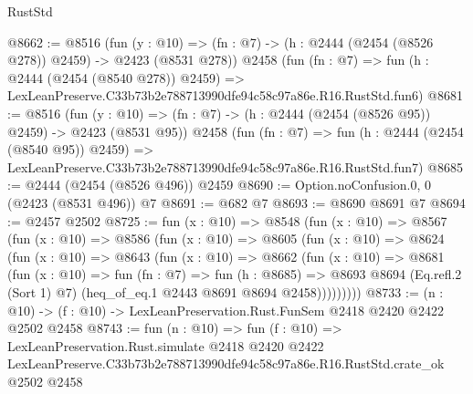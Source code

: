 \begin{lexlean}{RustStd}
\begin{coremodule}
@8662 := @8516
    (fun (y : @10) => (fn : @7) -> (h : @2444 (@2454 (@8526 @278)) @2459) -> @2423 (@8531 @278))
    @2458
    (fun (fn : @7) =>
    fun (h : @2444 (@2454 (@8540 @278)) @2459) =>
    LexLeanPreserve.C33b73b2e788713990dfe94c58c97a86e.R16.RustStd.fun6)
@8681 := @8516
    (fun (y : @10) => (fn : @7) -> (h : @2444 (@2454 (@8526 @95)) @2459) -> @2423 (@8531 @95))
    @2458
    (fun (fn : @7) =>
    fun (h : @2444 (@2454 (@8540 @95)) @2459) =>
    LexLeanPreserve.C33b73b2e788713990dfe94c58c97a86e.R16.RustStd.fun7)
@8685 := @2444 (@2454 (@8526 @496)) @2459
@8690 := Option.noConfusion.{0, 0} (@2423 (@8531 @496)) @7
@8691 := @682 @7
@8693 := @8690 @8691 @7
@8694 := @2457 @2502
@8725 := fun (x : @10) =>
  @8548
    (fun (x : @10) =>
    @8567
      (fun (x : @10) =>
      @8586
        (fun (x : @10) =>
        @8605
          (fun (x : @10) =>
          @8624
            (fun (x : @10) =>
            @8643
              (fun (x : @10) =>
              @8662
                (fun (x : @10) =>
                @8681
                  (fun (x : @10) =>
                  fun (fn : @7) =>
                  fun (h : @8685) =>
                  @8693
                    @8694
                    (Eq.refl.{2} (Sort 1) @7)
                    (heq_of_eq.{1} @2443 @8691 @8694 @2458)))))))))
@8733 := (n : @10) -> (f : @10) -> LexLeanPreservation.Rust.FunSem @2418 @2420 @2422 @2502 @2458
@8743 := fun (n : @10) =>
  fun (f : @10) =>
  LexLeanPreservation.Rust.simulate
    @2418
    @2420
    @2422
    LexLeanPreserve.C33b73b2e788713990dfe94c58c97a86e.R16.RustStd.crate_ok
    @2502
    @2458
\end{coremodule}
\end{lexlean}

